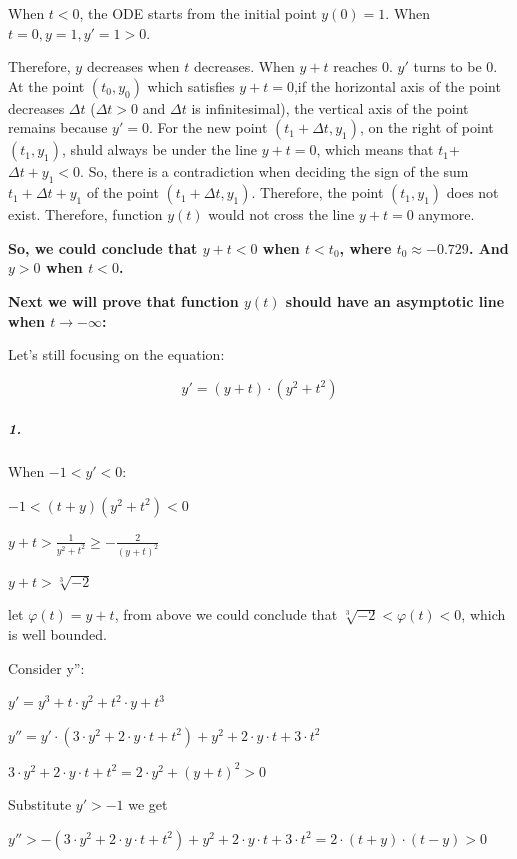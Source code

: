 \documentclass[11pt,a4paper]{article}
\begin{document}
\begin{multicols}{2}
	When $t<0$, the ODE starts from the initial point $y(0)=1$. When $t=0, y=1, y'=1>0$.
	
	Therefore, $y$ decreases when $t$ decreases. When $y+t$ reaches 0. $y'$ turns to be 0. At the point $(t_0, y_0)$ which satisfies $y+t=0$,if the horizontal axis of the point decreases $\Delta t$ ($\Delta t>0$ and $\Delta t$ is infinitesimal), the vertical axis of the point remains because $y' = 0$. For the new point $(t_1+ \Delta t, y_1)$, on the right of point $(t_1, y_1)$, shuld always be under the line $y+t=0$, which means that $t_1$+$\Delta t + y_1 < 0$. So, there is a contradiction when deciding the sign of the sum $t_1+\Delta t+y_1$ of the point $(t_1+\Delta t, y_1)$. Therefore, the point $(t_1, y_1)$ does not exist. Therefore, function $y(t)$ would not cross the line $y+t=0$ anymore.
	
	\textbf{So, we could conclude that $y+t<0$ when $t<t_0$, where $t_0 \approx -0.729$. And $y>0$ when $t<0$.}
	
	\textbf{Next we will prove that function $y(t)$ should have an asymptotic line when $t \rightarrow -\infty$:}
	
	Let's still focusing on the equation:
	
	\begin{equation}
		y'=(y+t)\cdot(y^2+t^2) \label{Equ 2.3.2.1}
	\end{equation}
	
	\subparagraph{1.} When $-1<y'<0:$
	
	\begin{center}
		$-1<(t+y)(y^2+t^2)<0$
		
		$y+t>\frac{1}{y^2+t^2}\geq -\frac{2}{(y+t)^2}$
		
		$y+t>\sqrt[3]{-2}$
		
	\end{center}
	let $\varphi(t)=y+t$, from above we could conclude that $\sqrt[3]{-2} < \varphi(t)<0$, which is well bounded.
	
	Consider y'':
	
	\begin{center}
		$y' = y^3+t\cdot y^2+t^2\cdot y+t^3$
		
		$y''=y'\cdot (3\cdot y^2+2\cdot y\cdot t+t^2)+y^2+2\cdot y\cdot t + 3\cdot t^2$
		
		$3\cdot y^2+2\cdot y \cdot t + t^2=2\cdot y^2+(y+t)^2>0$
	\end{center}

	Substitute $y'>-1$ we get
	
	\begin{center}
		$y''> -(3\cdot y^2+2\cdot y \cdot t + t^2)+y^2+2\cdot y \cdot t + 3\cdot t^2 = 2 \cdot (t+y)\cdot (t-y)>0$
	\end{center}


\end{multicols}
\end{document}
